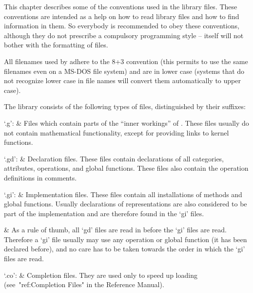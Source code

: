 

This chapter describes some of the conventions used in the {\GAP}
library files.
These conventions are intended as a help on how to read library files and
how to find information in them.
So everybody is recommended to obey these conventions,
although they do not prescribe a compulsory programming style
--{\GAP} itself will not bother with the formatting of files.

All filenames used by {\GAP} adhere to the 8+3 convention (this permits to
use the same filenames even on a MS-DOS file system) and are in lower
case (systems that do not recognize lower case in file names will convert
them automatically to upper case).


The {\GAP} library consists of the following types of files, distinguished
by their suffixes:

\beginitems
`.g': &
    Files which contain parts of the ``inner workings'' of {\GAP}.
    These files usually do not contain mathematical functionality,
    except for providing links to kernel functions.

`.gd': &
    Declaration files.
    These files contain declarations of all categories, attributes,
    operations, and global functions.
    These files also contain the operation definitions in comments.

`.gi': &
    Implementation files.
    These files contain all installations of methods and global functions.
    Usually declarations of representations are also considered to be
    part of the implementation and are therefore found in the `gi' files.

    &
    As a rule of thumb, all `gd' files are read in before the `gi' files
    are read.
    Therefore a `gi' file usually may use any operation or global function
    (it has been declared before),
    and no care has to be taken towards the order in which the `gi' files
    are read.

`.co': &
    Completion files.
    They are used only to speed up loading
    (see~"ref:Completion Files" in the Reference Manual).
\enditems


